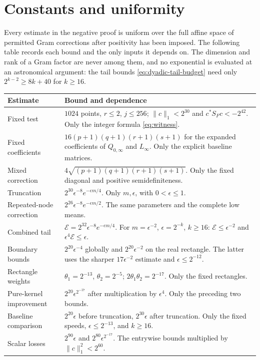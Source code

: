 \section{Constants and uniformity}\label{app:constants}
Every estimate in the negative proof is uniform over the full affine
space of permitted Gram corrections after positivity has been imposed.
The following table records each bound and the only inputs it depends
on. The dimension and rank of a Gram factor are never among them, and
no exponential is evaluated at an astronomical argument: the tail bounds
\eqref{eq:dyadic-tail-budget} need only $2^{k-2}\ge8k+40$ for $k\ge16$.

\begin{longtable}{@{}>{\raggedright\arraybackslash}p{}>{\raggedright\arraybackslash}p{}@{}}
\toprule
Estimate & Bound and dependence\\
\midrule\endhead
Fixed test & $1024$ points, $r\le2$, $j\le256$;
$\|c\|_1<2^{30}$ and $c^*S_Fc<-2^{42}$.
Only the integer formula \eqref{eq:witness}.\\[5pt]
Fixed coefficients & $16(p+1)(q+1)(r+1)(s+1)$ for the expanded
coefficients of $Q_{0,\infty}$ and $L_\infty$.
Only the explicit baseline matrices.\\[5pt]
Mixed correction & $4\sqrt{(p+1)(q+1)(r+1)(s+1)}$.
Only the fixed diagonal and positive semidefiniteness.\\[5pt]
Truncation & $2^{30}\epsilon^{-8}e^{-\epsilon m/4}$.
Only $m,\epsilon$, with $0<\epsilon\le1$.\\[5pt]
Repeated-node correction & $2^{26}\epsilon^{-8}e^{-\epsilon m/2}$.
The same parameters and the complete low means.\\[5pt]
Combined tail & $\mathcal E=2^{32}\epsilon^{-8}e^{-\epsilon m/4}$.
For $m=\epsilon^{-2}$, $\epsilon=2^{-k}$, $k\ge16$:
$\mathcal E\le\epsilon^{-2}$ and $\epsilon^4\mathcal E\le\epsilon$.\\[5pt]
Boundary bounds & $2^{20}\epsilon^{-4}$ globally and
$2^{20}\epsilon^{-2}$ on the real rectangle.
The latter uses the sharper $17\epsilon^{-2}$ estimate and
$\epsilon\le2^{-12}$.\\[5pt]
Rectangle weights & $\theta_1=2^{-13}$, $\theta_2=2^{-5}$;
$2\theta_1\theta_2=2^{-17}$. Only the fixed rectangles.\\[5pt]
Pure-kernel improvement & $2^{20}\epsilon^{2^{-17}}$
after multiplication by $\epsilon^4$. Only the preceding two bounds.\\[5pt]
Baseline comparison & $2^{20}\epsilon$ before truncation,
$2^{30}\epsilon$ after truncation. Only the fixed speeds, $\epsilon\le2^{-13}$, and $k\ge16$.\\[5pt]
Scalar losses & $2^{90}\epsilon$ and $2^{80}\epsilon^{2^{-17}}$.
The entrywise bounds multiplied by $\|c\|_1^2<2^{60}$.\\
\bottomrule
\end{longtable}

